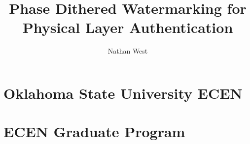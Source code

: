 \documentclass[12pt]{okstate-thesis}
\title{Phase Dithered Watermarking for Physical Layer Authentication}
\author{Nathan West}
\begin{document}
\frontmatter
\maketitle
{} %
\begin{acknowledge}
    
\end{acknowledge}
\begin{abstract} %
    
\end{abstract}
\tableofcontents
\listoftables
\listoffigures

%	

\mainmatter
\chapter{Oklahoma State University ECEN}

\chapter{ECEN Graduate Program}

%
\nocite{*} %

\appendix


\end{document}
